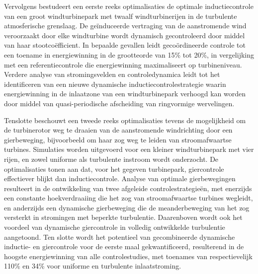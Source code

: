 Vervolgens bestudeert een eerste reeks optimalisaties de optimale inductiecontrole van een groot windturbinepark met twaalf windturbinerijen in de turbulente atmosferische grenslaag. De ge\"induceerde vertraging van de aanstromende wind veroorzaakt door elke windturbine wordt dynamisch gecontroleerd door middel van haar stootco\"efficient. In bepaalde gevallen leidt geco\"ordineerde controle tot een toename in energiewinning in de grootteorde van 15\% tot 20\%, in vergelijking met een referentiecontrole die energiewinning maximaliseert op turbineniveau. Verdere analyse van stromingsvelden en controledynamica leidt tot het identificeren van een nieuwe dynamische inductiecontrolestrategie waarin energiewinning in de inlaatzone van een windturbinepark verhoogd kan worden door middel van quasi-periodische afscheiding van ringvormige wervelingen. 

Tenslotte beschouwt een tweede reeks optimalisaties tevens de mogelijkheid om de turbinerotor weg te draaien van de aanstromende windrichting door een gierbeweging, bijvoorbeeld om haar zog weg te leiden van stroomafwaartse turbines. Simulaties worden uitgevoerd voor een kleiner windturbinepark met vier rijen, en zowel uniforme als turbulente instroom wordt onderzocht. De optimalisaties tonen aan dat, voor het gegeven turbinepark, giercontrole effectiever blijkt dan inductiecontrole. Analyse van optimale gierbewegingen resulteert in de ontwikkeling van twee afgeleide controlestrategie\"en, met enerzijds een constante hoekverdraaiing die het zog van stroomafwaartse turbines wegleidt, en anderzijds een dynamische gierbeweging die de meanderbeweging van het zog versterkt in stromingen met beperkte turbulentie. Daarenboven wordt ook het voordeel van dynamische giercontrole in volledig ontwikkelde turbulentie aangetoond. Ten slotte wordt het potentieel van gecombineerde dynamische inductie- en giercontrole voor de eerste maal gekwantificeerd, resulterend in de hoogste energiewinning van alle controlestudies, met toenames van respectievelijk 110\% en 34\% voor uniforme en turbulente inlaatstroming. 
\cleardoublepage

